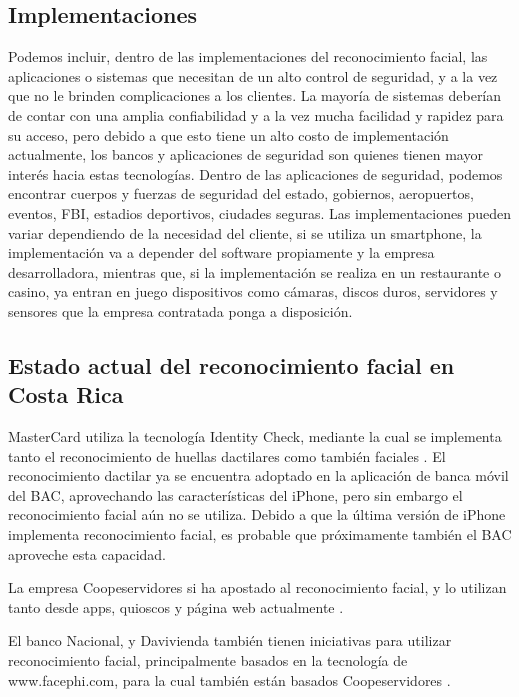 \documentclass[conference]{IEEEtran}
\begin{document}
\subsection{Implementaciones}
Podemos incluir, dentro de las implementaciones del reconocimiento facial, las aplicaciones o sistemas que necesitan de un alto control de seguridad, y a la vez que no le brinden complicaciones a los clientes. La mayoría de sistemas deberían de contar con una amplia confiabilidad y a la vez mucha facilidad y rapidez para su acceso, pero debido a que esto tiene un alto costo de implementación actualmente, los bancos y aplicaciones de seguridad son quienes tienen mayor interés hacia estas tecnologías. Dentro de las aplicaciones de seguridad, podemos encontrar cuerpos y fuerzas de seguridad del estado, gobiernos, aeropuertos, eventos, FBI, estadios deportivos, ciudades seguras.
Las implementaciones pueden variar dependiendo de la necesidad del cliente, si se utiliza un smartphone, la implementación va a depender del software propiamente y la empresa desarrolladora, mientras que, si la implementación se realiza en un restaurante o casino, ya entran en juego dispositivos como cámaras, discos duros, servidores y sensores que la empresa contratada ponga a disposición.


\subsection{Estado actual del reconocimiento facial en Costa Rica}

MasterCard utiliza la tecnología Identity Check, mediante la cual se implementa tanto el reconocimiento de huellas dactilares como también faciales \cite{b3}. El reconocimiento dactilar ya se encuentra adoptado en la aplicación de banca móvil del BAC, aprovechando las características del iPhone, pero sin embargo el reconocimiento facial aún no se utiliza. Debido a que la última versión de iPhone implementa reconocimiento facial, es probable que próximamente también el BAC aproveche esta capacidad.

La empresa Coopeservidores si ha apostado al reconocimiento facial, y lo utilizan tanto desde apps, quioscos y página web actualmente \cite{b3}.

El banco Nacional, y Davivienda también tienen iniciativas para utilizar reconocimiento facial, principalmente basados en la tecnología de www.facephi.com, para la cual también están basados Coopeservidores \cite{b4}.
\end{document}
